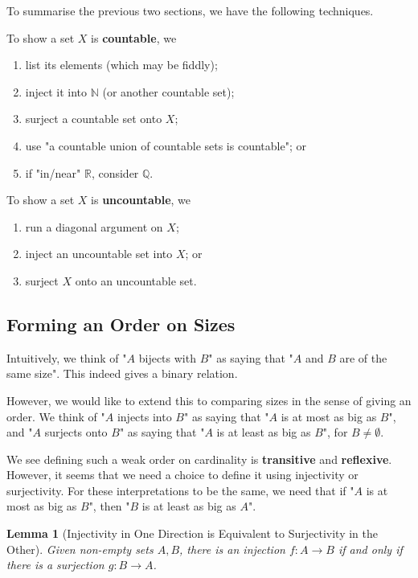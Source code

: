\documentclass{article}
\newtheorem{lemma}[theorem]{Lemma}
\theoremstyle{definition}
\theoremstyle{remark}
\newcommand{\functiondomain}[3]{#1:#2\to #3}
\newcommand{\NN}{\mathbb{N}}
\newcommand{\QQ}{\mathbb{Q}}
\newcommand{\RR}{\mathbb{R}}
\begin{document}
To summarise the previous two sections, we have the following techniques.

To show a set \(X\) is \textbf{countable}, we
\begin{enumerate}
    \item list its elements (which may be fiddly);
    \item inject it into \(\NN\) (or another countable set);
    \item surject a countable set onto \(X\);
    \item use "a countable union of countable sets is countable"; or
    \item if "in/near" \(\RR\), consider \(\QQ\).
\end{enumerate}

To show a set \(X\) is \textbf{uncountable}, we
\begin{enumerate}
    \item run a diagonal argument on \(X\);
    \item inject an uncountable set into \(X\); or
    \item surject \(X\) onto an uncountable set.
\end{enumerate}

\subsection{Forming an Order on Sizes}
\label{sec:order-on-sizes}

Intuitively, we think of "\(A\) bijects with \(B\)" as saying that "\(A\) and \(B\) are of the same size". This indeed gives a binary relation.

However, we would like to extend this to comparing sizes in the sense of giving an order. We think of "\(A\) injects into \(B\)" as saying that "\(A\) is at most as big as \(B\)", and "\(A\) surjects onto \(B\)" as saying that "\(A\) is at least as big as \(B\)", for \(B \neq \emptyset\).

We see defining such a weak order on cardinality is \textbf{transitive} and \textbf{reflexive}. However, it seems that we need a choice to define it using injectivity or surjectivity. For these interpretations to be the same, we need that if "\(A\) is at most as big as \(B\)", then "\(B\) is at least as big as \(A\)".

\begin{lemma}[Injectivity in One Direction is Equivalent to Surjectivity in the Other]
    Given non-empty sets \(A, B\), there is an injection \(\functiondomain{f}{A}{B}\) if and only if there is a surjection \(\functiondomain{g}{B}{A}\).
\end{lemma}
\end{document}
